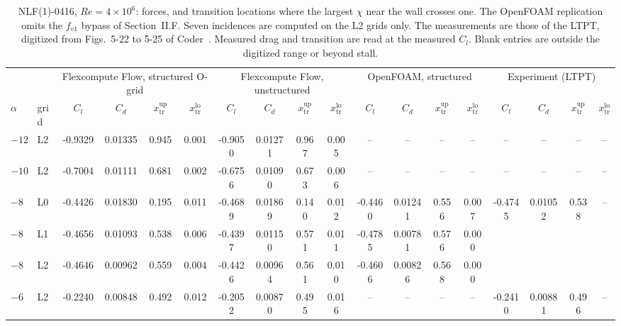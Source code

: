 \documentclass[conf]{new-aiaa}
\begin{document}


\begin{table}[!htbp]
  \centering\scriptsize\setlength{\tabcolsep}{2pt}
  \caption{NLF(1)-0416, $Re\!=\!4\!\times\!10^6$: forces, and transition locations where the largest $\chi$ near the wall crosses one. The OpenFOAM replication omits the $f_{v1}$ bypass of Section~II.F. Seven incidences are computed on the L2 grids only. The measurements are those of the LTPT, digitized from Figs.~5-22 to 5-25 of Coder~\cite{coder_thesis_2014}. Measured drag and transition are read at the measured $C_l$. Blank entries are outside the digitized range or beyond stall.}
  \label{t:nlf}
  \begin{tabular}{ll cccc cccc cccc cccc}
    \toprule
    & & \multicolumn{4}{c}{Flexcompute Flow, structured O-grid} & \multicolumn{4}{c}{Flexcompute Flow, unstructured} & \multicolumn{4}{c}{OpenFOAM, structured} & \multicolumn{4}{c}{Experiment (LTPT)} \\
    \cmidrule(lr){3-6}\cmidrule(lr){7-10}\cmidrule(lr){11-14}\cmidrule(lr){15-18}
    $\alpha$ & grid & $C_l$ & $C_d$ & $x_\mathrm{tr}^\mathrm{up}$ & $x_\mathrm{tr}^\mathrm{lo}$ & $C_l$ & $C_d$ & $x_\mathrm{tr}^\mathrm{up}$ & $x_\mathrm{tr}^\mathrm{lo}$ & $C_l$ & $C_d$ & $x_\mathrm{tr}^\mathrm{up}$ & $x_\mathrm{tr}^\mathrm{lo}$ & $C_l$ & $C_d$ & $x_\mathrm{tr}^\mathrm{up}$ & $x_\mathrm{tr}^\mathrm{lo}$ \\
    \midrule
    $-12$ & L2 & -0.9329 & 0.01335 & 0.945 & 0.001 & -0.9050 & 0.01271 & 0.967 & 0.005 & -- & -- & -- & -- & -- & -- & -- & -- \\
    \addlinespace
    $-10$ & L2 & -0.7004 & 0.01111 & 0.681 & 0.002 & -0.6756 & 0.01090 & 0.673 & 0.006 & -- & -- & -- & -- & -- & -- & -- & -- \\
    \addlinespace
    $-8$ & L0 & -0.4426 & 0.01830 & 0.195 & 0.011 & -0.4689 & 0.01869 & 0.140 & 0.012 & -0.4460 & 0.01241 & 0.556 & 0.007 & -0.4745 & 0.01052 & 0.538 & -- \\
    $-8$ & L1 & -0.4656 & 0.01093 & 0.538 & 0.006 & -0.4397 & 0.01150 & 0.571 & 0.011 & -0.4785 & 0.00781 & 0.576 & 0.000 &  &  &  &  \\
    $-8$ & L2 & -0.4646 & 0.00962 & 0.559 & 0.004 & -0.4426 & 0.00964 & 0.561 & 0.010 & -0.4606 & 0.00826 & 0.568 & 0.000 &  &  &  &  \\
    \addlinespace
    $-6$ & L2 & -0.2240 & 0.00848 & 0.492 & 0.012 & -0.2052 & 0.00870 & 0.495 & 0.016 & -- & -- & -- & -- & -0.2410 & 0.00881 & 0.496 & -- \\

\end{tabular}
\end{table}
\end{document}
